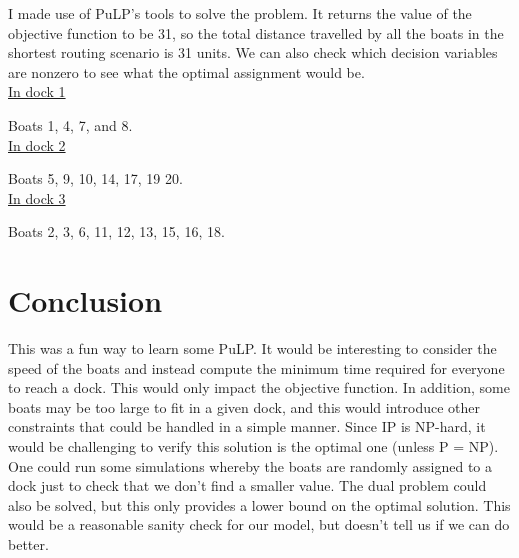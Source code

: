 \documentclass[12pt,english]{article}
\begin{document}
I made use of PuLP's tools to solve the problem.  It returns the value of the objective function to be 31, so the total distance travelled by all the boats in the shortest routing scenario is 31 units.  We can also check which decision variables are nonzero to see what the optimal assignment would be. \\


\underline{In dock 1}

Boats 1, 4, 7, and 8. \\

\underline{In dock 2}

Boats 5, 9, 10, 14, 17, 19 20. \\

\underline{In dock 3}

Boats 2, 3, 6, 11, 12, 13, 15, 16, 18. \\

\section{Conclusion}

This was a fun way to learn some PuLP.  It would be interesting to consider the speed of the boats and instead compute the minimum time required for everyone to reach a dock.  This would only impact the objective function.  In addition, some boats may be too large to fit in a given dock, and this would introduce other constraints that could be handled in a simple manner.  Since IP is NP-hard, it would be challenging to verify this solution is the optimal one (unless P = NP).  One could run some simulations whereby the boats are randomly assigned to a dock just to check that we don't find a smaller value.  The dual problem could also be solved, but this only provides a lower bound on the optimal solution.  This would be a reasonable sanity check for our model, but doesn't tell us if we can do better.
\end{document}
